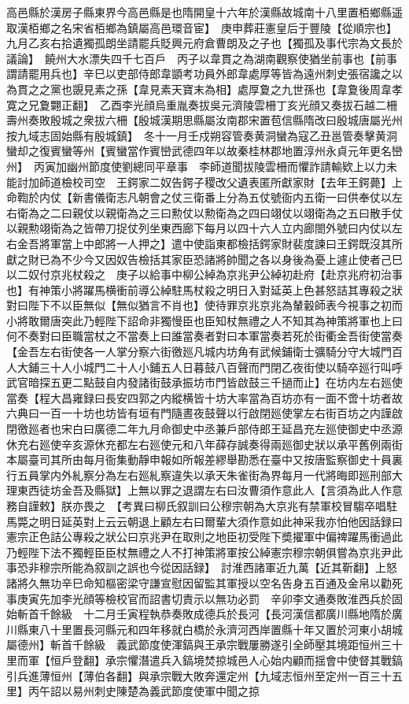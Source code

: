 高邑縣於漢房子縣東界今高邑縣是也隋開皇十六年於漢縣故城南十八里置栢鄉縣遥取漢栢鄉之名宋省栢鄉為鎮屬高邑環音宦】　庚申葬莊憲皇后于豐陵【從順宗也】九月乙亥右拾遺獨孤朗坐請罷兵貶興元府倉曹朗及之子也【獨孤及事代宗為文長於議論】　饒州大水漂失四千七百戶　丙子以韋貫之為湖南觀察使猶坐前事也【前事謂請罷用兵也】辛巳以吏部侍郎韋顗考功員外郎韋處厚等皆為遠州刺史張宿讒之以為貫之之黨也覬見素之孫【韋見素天寶末為相】處厚夐之九世孫也【韋夐後周韋孝寛之兄夐翾正翻】　乙酉李光顔烏重胤奏拔吳元濟陵雲柵丁亥光顔又奏拔石越二柵壽州奏敗殷城之衆拔六柵【殷城漢期思縣屬汝南郡宋置苞信縣隋改曰殷城唐屬光州按九域志固始縣有殷城鎮】　冬十一月壬戍朔容管奏黄洞蠻為寇乙丑邕管奏擊黄洞蠻却之復賓蠻等州【賓蠻當作賓巒武德四年以故秦桂林郡地置淳州永貞元年更名巒州】　丙寅加幽州節度使劉總同平章事　李師道聞拔陵雲柵而懼詐請輸欵上以力未能討加師道檢校司空　王鍔家二奴告鍔子稷改父遺表匿所獻家財【去年王鍔薨】上命鞫於内仗【新書儀衛志凡朝會之仗三衛番上分為五仗號衙内五衛一曰供奉仗以左右衛為之二曰親仗以親衛為之三曰勲仗以勲衛為之四曰翊仗以翊衛為之五曰散手仗以親勲翊衛為之皆帶刀捉仗列坐東西廊下每月以四十六人立内廊閤外號曰内仗以左右金吾將軍當上中郎將一人押之】遣中使詣東都檢括鍔家財裴度諫曰王鍔既沒其所獻之財已為不少今又因奴告檢括其家臣恐諸將帥聞之各以身後為憂上遽止使者己巳以二奴付京兆杖殺之　庚子以給事中柳公綽為京兆尹公綽初赴府【赴京兆府初治事也】有神策小將躍馬横衝前導公綽駐馬杖殺之明日入對延英上色甚怒詰其專殺之狀對曰陛下不以臣無似【無似猶言不肖也】使待罪京兆京兆為輦轂師表今視事之初而小將敢爾唐突此乃輕陛下詔命非獨慢臣也臣知杖無禮之人不知其為神策將軍也上曰何不奏對曰臣職當杖之不當奏上曰誰當奏者對曰本軍當奏若死於街衢金吾街使當奏【金吾左右街使各一人掌分察六街徼廵凡城内坊角有武候鋪衛士彍騎分守大城門百人大鋪三十人小城門二十人小鋪五人日暮鼓八百聲而門閉乙夜街使以騎卒廵行叫呼武官暗探五更二點鼓自内發諸街鼓承振坊市門皆啟鼓三千撾而止】在坊内左右廵使當奏【程大昌雍録曰長安四郭之内縱横皆十坊大率當為百坊亦有一面不啻十坊者故六典曰一百一十坊也坊皆有垣有門隨晝夜鼓聲以行啟閉廵使掌左右街百坊之内謹啟閉徼廵者也宋白曰廣德二年九月命御史中丞兼戶部侍郎王延昌充左廵使御史中丞源休充右廵使辛亥源休充都左右廵使元和八年薛存誠奏得兩廵御史狀以承平舊例兩街本屬臺司其所由每月衙集動靜申報如所報差繆舉勘悉在臺中又按唐監察御史十員裏行五員掌内外糺察分為左右廵糺察違失以承天朱雀街為界每月一代將晦即廵刑部大理東西徒坊金吾及縣獄】上無以罪之退謂左右曰汝曹須作意此人【言須為此人作意務自謹敕】朕亦畏之　【考異曰柳氏叙訓曰公穆宗朝為大京兆有禁軍校冒騶卒唱駐馬斃之明日延英對上云云朝退上顧左右曰爾輩大須作意如此神采我亦怕他因話録曰憲宗正色詰公專殺之狀公曰京兆尹在取則之地臣初受陛下奬擢軍中偏禆躍馬衝過此乃輕陛下法不獨輕臣臣杖無禮之人不打神策將軍按公綽憲宗穆宗朝俱嘗為京兆尹此事恐非穆宗所能為叙訓之誤也今從因話録】　討淮西諸軍近九萬【近其靳翻】上怒諸將久無功辛巳命知樞密梁守謙宣慰因留監其軍授以空名告身五百通及金帛以勸死事庚寅先加李光顔等檢校官而詔書切責示以無功必罰　辛卯李文通奏敗淮西兵於固始斬首千餘級　十二月壬寅程執恭奏敗成德兵於長河【長河漢信都廣川縣地隋於廣川縣東八十里置長河縣元和四年移就白橋於永濟河西岸置縣十年又置於河東小胡城屬德州】斬首千餘級　義武節度使渾鎬與王承宗戰屢勝遂引全師壓其境距恒州三十里而軍【恒戶登翻】承宗懼潛遣兵入鎬境焚掠城邑人心始内顧而揺會中使督其戰鎬引兵進薄恒州【薄伯各翻】與承宗戰大敗奔還定州【九域志恒州至定州一百三十五里】丙午詔以易州刺史陳楚為義武節度使軍中聞之掠